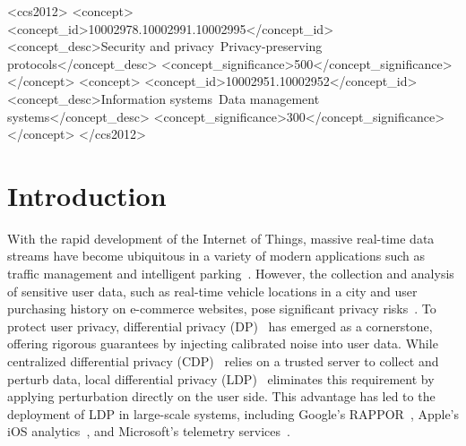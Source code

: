 \documentclass[acmsmall]{acmart}
\begin{document}
\begin{CCSXML}
<ccs2012>
 <concept>
  <concept_id>10002978.10002991.10002995</concept_id>
  <concept_desc>Security and privacy~Privacy-preserving protocols</concept_desc>
  <concept_significance>500</concept_significance>
 </concept>
 <concept>
    <concept_id>10002951.10002952</concept_id>
    <concept_desc>Information systems~Data management systems</concept_desc>
    <concept_significance>300</concept_significance>
 </concept>
</ccs2012>
\end{CCSXML}




\maketitle


\section{Introduction} \label{sec:introduction}

With the rapid development of the Internet of Things, massive real-time data
streams have become ubiquitous in a variety of modern applications such as
traffic management and intelligent parking~\cite{Babcock2002, Babu2001}.
However, the collection and analysis of sensitive user data, such as real-time
vehicle locations in a city and user purchasing history on e-commerce websites,
pose significant privacy risks~\cite{Al2022, Ray2020, Malhotra2021}.
To protect user privacy, differential privacy (DP)~\cite{Dwork2006} has emerged
as a cornerstone, offering rigorous guarantees by injecting calibrated noise into
user data.
While centralized differential privacy (CDP)~\cite{Bolot2013} relies on a
trusted server to collect and perturb data, local differential privacy
(LDP)~\cite{Wang2017l, Wang2018p, Ren2018, Zhang2018, Duchi2013, Cormode2018,
  Wang2019l, Murakami2019, Ye2019, Qin2016, Qin2017} eliminates this requirement
by applying perturbation directly on the user side.
This advantage has led to the deployment of LDP in large-scale systems,
including Google's RAPPOR~\cite{Erlingsson2014}, Apple’s iOS
analytics~\cite{Team2017}, and Microsoft’s telemetry services~\cite{Ding2017}.
\end{document}
